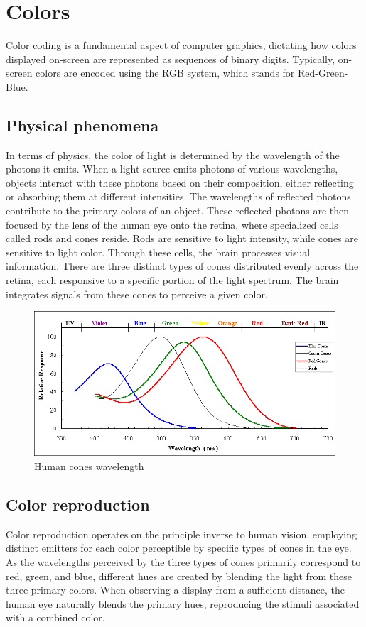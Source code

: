 \section{Colors}

Color coding is a fundamental aspect of computer graphics, dictating how colors displayed on-screen are represented as sequences of binary digits.
Typically, on-screen colors are encoded using the RGB system, which stands for Red-Green-Blue.

\subsection{Physical phenomena}
In terms of physics, the color of light is determined by the wavelength of the photons it emits.
When a light source emits photons of various wavelengths, objects interact with these photons based on their composition, either reflecting or absorbing them at different intensities.
The wavelengths of reflected photons contribute to the primary colors of an object.
These reflected photons are then focused by the lens of the human eye onto the retina, where specialized cells called rods and cones reside.
Rods are sensitive to light intensity, while cones are sensitive to light color.
Through these cells, the brain processes visual information. 
There are three distinct types of cones distributed evenly across the retina, each responsive to a specific portion of the light spectrum. 
The brain integrates signals from these cones to perceive a given color.

\begin{figure}[H]
    \centering
    \includegraphics[width=0.4\linewidth]{images/cones.png}
    \caption{Human cones wavelength}
\end{figure}

\subsection{Color reproduction}
Color reproduction operates on the principle inverse to human vision, employing distinct emitters for each color perceptible by specific types of cones in the eye.
As the wavelengths perceived by the three types of cones primarily correspond to red, green, and blue, different hues are created by blending the light from these three primary colors. 
When observing a display from a sufficient distance, the human eye naturally blends the primary hues, reproducing the stimuli associated with a combined color.

